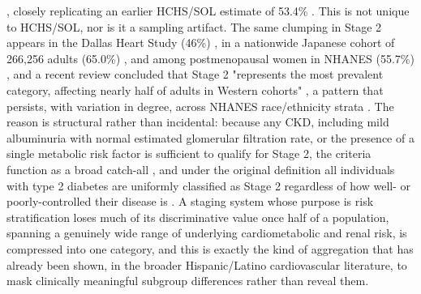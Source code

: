 \documentclass[11pt]{article}
\begin{document}
\citep{kondeti2026progression}, closely replicating an earlier HCHS/SOL estimate of 53.4\% \citep{chakrabarti2024prevalence}. This is not unique to HCHS/SOL, nor is it a sampling artifact. The same clumping in Stage 2 appears in the Dallas Heart Study (46\%) \citep{shelbaya2025dallas}, in a nationwide Japanese cohort of 266,256 adults (65.0\%) \citep{fujimoto2025stagespecific}, and among postmenopausal women in NHANES (55.7\%) \citep{chen2025postmenopausal}, and a recent review concluded that Stage 2 "represents the most prevalent category, affecting nearly half of adults in Western cohorts" \citep{gunnarsson2025ckm}, a pattern that persists, with variation in degree, across NHANES race/ethnicity strata \citep{ogungbe2024disparities}. The reason is structural rather than incidental: because any CKD, including mild albuminuria with normal estimated glomerular filtration rate, or the presence of a single metabolic risk factor is sufficient to qualify for Stage 2, the criteria function as a broad catch-all \citep{gregg2025riskassessment}, and under the original definition all individuals with type 2 diabetes are uniformly classified as Stage 2 regardless of how well- or poorly-controlled their disease is \citep{gohda2026refining}. A staging system whose purpose is risk stratification loses much of its discriminative value once half of a population, spanning a genuinely wide range of underlying cardiometabolic and renal risk, is compressed into one category, and this is exactly the kind of aggregation that has already been shown, in the broader Hispanic/Latino cardiovascular literature, to mask clinically meaningful subgroup differences rather than reveal them.
\end{document}
